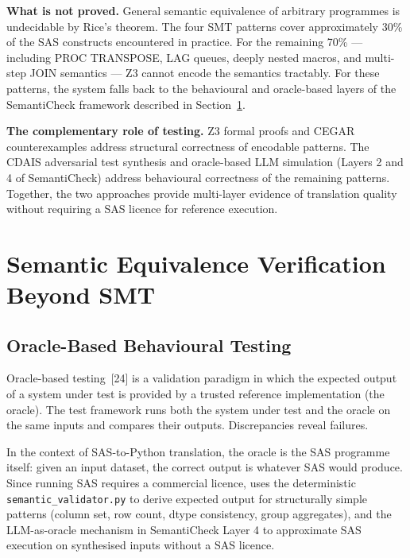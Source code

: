 \textbf{What is not proved.} General semantic equivalence of arbitrary
programmes is undecidable by Rice's theorem. The four \ac{SMT} patterns cover
approximately 30\% of the SAS constructs encountered in practice. For the
remaining 70\% --- including PROC TRANSPOSE, LAG queues, deeply nested macros,
and multi-step JOIN semantics --- Z3 cannot encode the semantics tractably. For
these patterns, the system falls back to the behavioural and oracle-based layers
of the SemantiCheck framework described in Section~\ref{sec:semantic-equiv-theory}.

\textbf{The complementary role of testing.} Z3 formal proofs and \ac{CEGAR}
counterexamples address structural correctness of encodable patterns. The
\ac{CDAIS} adversarial test synthesis and oracle-based \ac{LLM} simulation
(Layers 2 and 4 of SemantiCheck) address behavioural correctness of the
remaining patterns. Together, the two approaches provide multi-layer evidence
of translation quality without requiring a SAS licence for reference execution.

\section{Semantic Equivalence Verification Beyond SMT}
\label{sec:semantic-equiv-theory}

\subsection{Oracle-Based Behavioural Testing}
\label{subsec:oracle-testing-theory}

Oracle-based testing~[24] is a validation paradigm in which the expected output
of a system under test is provided by a trusted reference implementation (the
oracle). The test framework runs both the system under test and the oracle on
the same inputs and compares their outputs. Discrepancies reveal failures.

In the context of SAS-to-Python translation, the oracle is the SAS programme
itself: given an input dataset, the correct output is whatever SAS would
produce. Since running SAS requires a commercial licence, \codara{} uses the
deterministic \texttt{semantic\_validator.py} to derive expected output for
structurally simple patterns (column set, row count, dtype consistency, group
aggregates), and the \ac{LLM}-as-oracle mechanism in SemantiCheck Layer 4 to
approximate SAS execution on synthesised inputs without a SAS licence.

